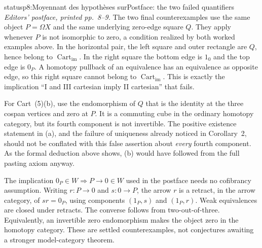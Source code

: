 \begin{dcomment}{status}{p8:Moyennant des hypothèses sur}{Postface: the two failed quantifiers}
\emph{Editors' postface, printed pp.~8--9.}
The two final counterexamples use the same object $P=\Omega X$ and the same underlying zero-edge square $Q$. They apply whenever $P$ is not isomorphic to zero, a condition realized by both worked examples above. In the horizontal pair, the left square and outer rectangle are $Q$, hence belong to $\operatorname{Cart}_{\mathrm{im}}$. In the right square the bottom edge is $1_0$ and the top edge is $0_P$. A homotopy pullback of an equivalence has an equivalence as opposite edge, so this right square cannot belong to $\operatorname{Cart}_{\mathrm{im}}$. This is exactly the implication ``I and III cartesian imply II cartesian'' that fails.

For Cart~(5)(b), use the endomorphism of $Q$ that is the identity at the three cospan vertices and zero at $P$. It is a commuting cube in the ordinary homotopy category, but its fourth component is not invertible. The positive existence statement in (a), and the failure of uniqueness already noticed in Corollary~2, should not be conflated with this false assertion about \emph{every} fourth component. As the formal deduction above shows, (b) would have followed from the full pasting axiom anyway.

The implication $0_P\in W\Rightarrow P\to0\in W$ used in the postface needs no cofibrancy assumption. Writing $r:P\to0$ and $s:0\to P$, the arrow $r$ is a retract, in the arrow category, of $sr=0_P$, using components $(1_P,s)$ and $(1_P,r)$. Weak equivalences are closed under retracts. The converse follows from two-out-of-three. Equivalently, an invertible zero endomorphism makes the object zero in the homotopy category. These are settled counterexamples, not conjectures awaiting a stronger model-category theorem.
\end{dcomment}

